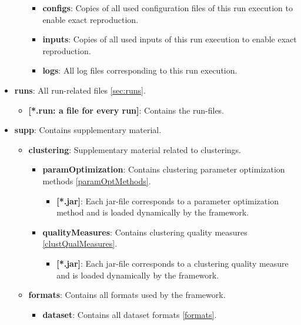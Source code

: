 \begin{itemize}[noitemsep]
\begin{itemize}
\begin{itemize}[noitemsep,nolistsep]
						\item \textbf{configs}: Copies of all used configuration files of this run execution to enable exact reproduction.
						\item \textbf{inputs}: Copies of all used inputs of this run execution to enable exact reproduction.
						\item \textbf{logs}: All log files corresponding to this run execution.
					\end{itemize}
				\end{itemize}
				\item \textbf{runs}: All run-related files \ref{sec:runs}.
				\begin{itemize}[noitemsep,nolistsep]
					\item \textbf{[*.run: a file for every run]}: Contains the run-files.
				\end{itemize}
				\item \textbf{supp}: Contains supplementary material.
				\begin{itemize}[noitemsep,nolistsep]
					\item \textbf{clustering}: Supplementary material related to clusterings.
					\begin{itemize}[noitemsep,nolistsep]
						\item \textbf{paramOptimization}: Contains clustering parameter optimization methods \ref{paramOptMethods}.
						\begin{itemize}[noitemsep,nolistsep]
							\item \textbf{[*.jar]}: Each jar-file corresponds to a parameter optimization method and is loaded dynamically by the framework.
						\end{itemize}
						\item \textbf{qualityMeasures}: Contains clustering quality measures \ref{clustQualMeasures}.
						\begin{itemize}[noitemsep,nolistsep]
							\item \textbf{[*.jar]}: Each jar-file corresponds to a clustering quality measure and is loaded dynamically by the framework.
						\end{itemize}
					\end{itemize}
					\item \textbf{formats}: Contains all formats used by the framework.
					\begin{itemize}[noitemsep,nolistsep]
						\item \textbf{dataset}: Contains all dataset formats \ref{formats}.
						\begin{itemize}

\end{itemize}
\end{itemize}
\end{itemize}
\end{itemize}
